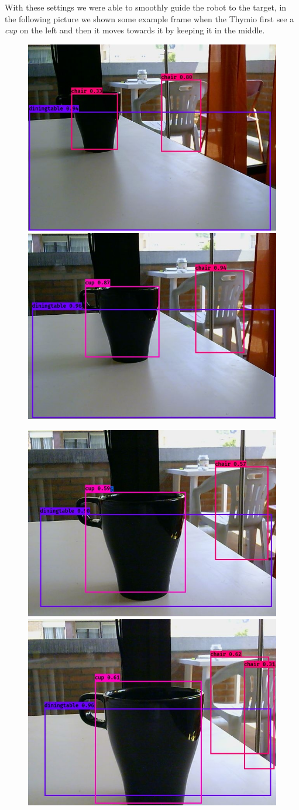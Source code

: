 \documentclass[letterpaper, 10 pt, conference]{ieeeconf}  %
\begin{document}
With these settings we were able to smoothly guide the robot to the target, in the following picture we shown some example frame when the Thymio first see a \emph{cup} on the left and then it moves towards it by keeping it in the middle.
\begin{figure}[H]
\begin{center}
\includegraphics[width=0.48\linewidth]{images/cup/1}	
\includegraphics[width=0.48\linewidth]{images/cup/2}	
\end{center}
\begin{center}
\includegraphics[width=0.48\linewidth]{images/cup/3}	
\includegraphics[width=0.48\linewidth]{images/cup/4}	

\end{center}
\end{figure}
\end{document}
